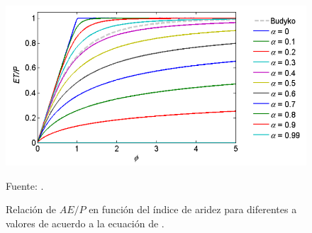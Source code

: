 \begin{figure}[htb]
	\includegraphics[width=13cm]{Images/budyko01.png}
	\centering
	\caption{Relación de $AE/P$ en función del índice de aridez para diferentes a valores de acuerdo a la ecuación de \citet{Fu1981}.}
	Fuente: \citet{Krogh2011}.
	\label{fig:budyko01}
\end{figure}

 
